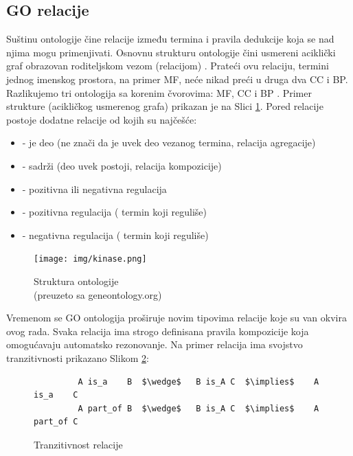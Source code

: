 \subsection{GO relacije}

Suštinu ontologije čine relacije između termina i pravila dedukcije koja se nad
njima mogu primenjivati. Osnovnu strukturu ontologije čini usmereni aciklički
graf  obrazovan roditeljskom vezom (relacijom) . Prateći
ovu relaciju, termini jednog imenskog prostora, na primer MF, neće nikad preći u
druga dva CC i BP. Razlikujemo tri ontologija sa korenim čvorovima:  MF, CC i BP
\parencite{go_struktura}. Primer strukture (acikličkog usmerenog grafa) prikazan je na
Slici \ref{fig:kinase}.  Pored relacije  postoje dodatne relacije od kojih
su najčešće:

\begin{itemize}
  \item {}  - je deo  (ne znači da je uvek deo vezanog termina, relacija agregacije)
  \item {} - sadrži (deo uvek postoji, relacija kompozicije)
  \item {} - pozitivna ili negativna regulacija
  \item {} - pozitivna regulacija  
    ( termin koji reguliše)
  \item {} - negativna regulacija 
    ( termin koji reguliše)
\end{itemize}

\begin{figure}[h!]
  \centering
  \texttt{[image: img/kinase.png]}
  \caption{Struktura ontologije\\ \footnotesize (preuzeto sa geneontology.org)}
  \label{fig:kinase}
\end{figure}

Vremenom se GO ontologija proširuje novim tipovima relacije koje su van okvira ovog rada.
Svaka relacija ima strogo definisana pravila kompozicije koja omogućavaju
automatsko rezonovanje. Na primer relacija  ima svojstvo
tranzitivnosti \parencite{is_a} prikazano Slikom \ref{fig:is_a}:
\lstset{
  basicstyle=\ttfamily, mathescape,
  numbers=none
}

\begin{figure}[h!]
  \centering
\begin{lstlisting}
         A is_a    B  $\wedge$   B is_A C  $\implies$    A is_a    C           
         A part_of B  $\wedge$   B is_A C  $\implies$    A part_of C
\end{lstlisting}
\caption{Tranzitivnost relacije }
  \label{fig:is_a}
\end{figure}


